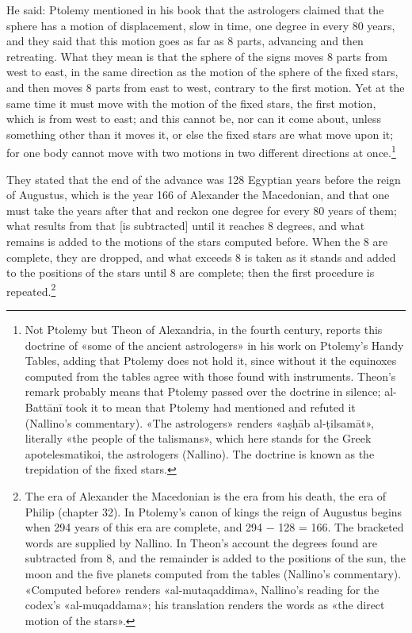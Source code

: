 \documentclass[11pt]{article}
\newcommand{\ArPage}[1]{\marginpar{\footnotesize\color{gray}Ar.\,p.\,#1}}
\begin{document}
\par He said: Ptolemy mentioned in his book that the astrologers claimed that the sphere has a motion of displacement, slow in time, one degree in every 80 years, and they said that this motion goes as far as 8 parts, advancing and then retreating. What they mean is that the sphere of the signs moves 8 parts from west to east, in the same direction as the motion of the sphere of the fixed stars, and then moves 8 parts from east to west, contrary to the first motion. Yet at the same time it must move with the motion of the fixed stars, the first motion, which is from west to east; and this cannot be, nor can it come about, unless something other than it moves it, or else the fixed stars are what move upon it; for one body cannot move with two motions in two different directions at once.\footnote{Not Ptolemy but Theon of Alexandria, in the fourth century, reports this doctrine of «some of the ancient astrologers» in his work on Ptolemy's Handy Tables, adding that Ptolemy does not hold it, since without it the equinoxes computed from the tables agree with those found with instruments. Theon's remark probably means that Ptolemy passed over the doctrine in silence; al-Battānī took it to mean that Ptolemy had mentioned and refuted it (Nallino's commentary). «The astrologers» renders «aṣḥāb al-ṭilsamāt», literally «the people of the talismans», which here stands for the Greek apotelesmatikoi, the astrologers (Nallino). The doctrine is known as the trepidation of the fixed stars.}\par
\par \ArPage{191}They stated that the end of the advance was 128 Egyptian years before the reign of Augustus, which is the year 166 of Alexander the Macedonian, and that one must take the years after that and reckon one degree for every 80 years of them; what results from that [is subtracted] until it reaches 8 degrees, and what remains is added to the motions of the stars computed before. When the 8 are complete, they are dropped, and what exceeds 8 is taken as it stands and added to the positions of the stars until 8 are complete; then the first procedure is repeated.\footnote{The era of Alexander the Macedonian is the era from his death, the era of Philip (chapter 32). In Ptolemy's canon of kings the reign of Augustus begins when 294 years of this era are complete, and 294 − 128 = 166. The bracketed words are supplied by Nallino. In Theon's account the degrees found are subtracted from 8, and the remainder is added to the positions of the sun, the moon and the five planets computed from the tables (Nallino's commentary). «Computed before» renders «al-mutaqaddima», Nallino's reading for the codex's «al-muqaddama»; his translation renders the words as «the direct motion of the stars».}\par
\end{document}
